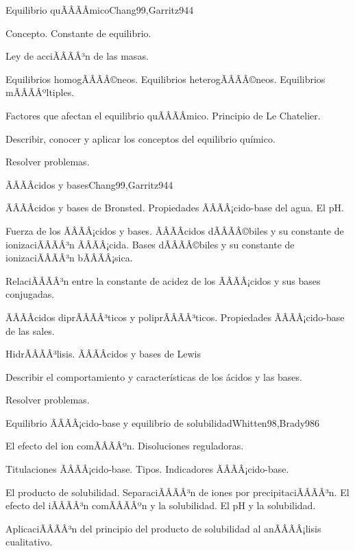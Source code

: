 \begin{sumilla}
\begin{unit}{Equilibrio quÃÂÃÂ­mico}{Chang99,Garritz94}{4}
\begin{topicos}
      \item Concepto. Constante de equilibrio.
      \item Ley de acciÃÂÃÂ³n de las masas.
      \item Equilibrios homogÃÂÃÂ©neos. Equilibrios heterogÃÂÃÂ©neos. Equilibrios mÃÂÃÂºltiples.
      \item Factores que afectan el equilibrio quÃÂÃÂ­mico. Principio de Le Chatelier.
    \end{topicos}
   \begin{objetivos}
      \item Describir, conocer y aplicar los conceptos del equilibrio qu\'imico.
      \item Resolver problemas.
   \end{objetivos}
\end{unit}

\begin{unit}{ÃÂÃÂcidos y bases}{Chang99,Garritz94}{4}
\begin{topicos}
	\item ÃÂÃÂcidos y bases de Bronsted. Propiedades ÃÂÃÂ¡cido-base del agua. El pH.
	\item Fuerza de los ÃÂÃÂ¡cidos y bases. ÃÂÃÂcidos dÃÂÃÂ©biles y su constante de ionizaciÃÂÃÂ³n ÃÂÃÂ¡cida. Bases dÃÂÃÂ©biles y su constante de ionizaciÃÂÃÂ³n bÃÂÃÂ¡sica. 
	\item RelaciÃÂÃÂ³n entre la constante de acidez de los ÃÂÃÂ¡cidos y sus bases conjugadas.
	\item ÃÂÃÂcidos diprÃÂÃÂ³ticos y poliprÃÂÃÂ³ticos. Propiedades ÃÂÃÂ¡cido-base de las sales.
	\item HidrÃÂÃÂ³lisis.  ÃÂÃÂcidos y bases de Lewis
\end{topicos}

\begin{objetivos}
	\item Describir el comportamiento y caracter\'isticas de los \'acidos y las bases.
	\item Resolver problemas.
\end{objetivos}
\end{unit}

\begin{unit}{Equilibrio ÃÂÃÂ¡cido-base y equilibrio de solubilidad}{Whitten98,Brady98}{6}
\begin{topicos}
	\item El efecto del ion comÃÂÃÂºn. Disoluciones reguladoras.
	\item Titulaciones ÃÂÃÂ¡cido-base. Tipos.  Indicadores ÃÂÃÂ¡cido-base.
	\item El producto de solubilidad. SeparaciÃÂÃÂ³n de iones por precipitaciÃÂÃÂ³n. El efecto del iÃÂÃÂ³n comÃÂÃÂºn y la solubilidad. El pH y la solubilidad.
	\item AplicaciÃÂÃÂ³n del principio del producto de solubilidad al anÃÂÃÂ¡lisis cualitativo.
\end{topicos}


\end{unit}
\end{sumilla}
